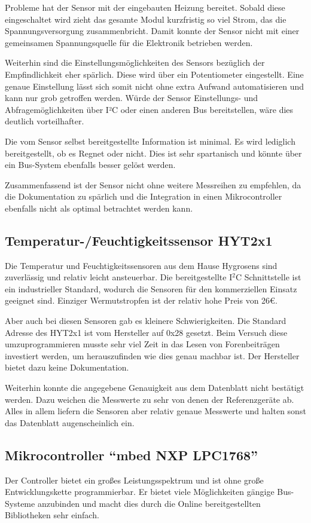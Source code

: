 			Probleme hat der Sensor mit der eingebauten Heizung bereitet. Sobald diese eingeschaltet wird zieht das gesamte Modul kurzfristig so viel Strom, das die Spannungsversorgung zusammenbricht. Damit konnte der Sensor nicht mit einer gemeinsamen Spannungsquelle für die Elektronik betrieben werden.
			
			Weiterhin sind die Einstellungsmöglichkeiten des Sensors bezüglich der Empfindlichkeit eher spärlich. Diese wird über ein Potentiometer eingestellt. Eine genaue Einstellung lässt sich somit nicht ohne extra Aufwand automatisieren und kann nur grob getroffen werden. Würde der Sensor Einstellungs- und Abfragemöglichkeiten über I²C oder einen anderen Bus bereitstellen, wäre dies deutlich vorteilhafter.
			
			Die vom Sensor selbst bereitgestellte Information ist minimal. Es wird lediglich bereitgestellt, ob es Regnet oder nicht. Dies ist sehr spartanisch und könnte über ein Bus-System ebenfalls besser gelöst werden.
			
			Zusammenfassend ist der Sensor nicht ohne weitere Messreihen zu empfehlen, da die Dokumentation zu spärlich und die Integration in einen Mikrocontroller ebenfalls nicht als optimal betrachtet werden kann.
		\subsection{Temperatur-/Feuchtigkeitssensor HYT2x1}
			Die Temperatur und Feuchtigkeitssensoren aus dem Hause Hygrosens sind zuverlässig und relativ leicht ansteuerbar. Die bereitgestellte I$^{2}$C Schnittstelle ist ein industrieller Standard, wodurch die Sensoren für den kommerziellen Einsatz geeignet sind. Einziger Wermutstropfen ist der relativ hohe Preis von 26\euro{}.
			
			Aber auch bei diesen Sensoren gab es kleinere Schwierigkeiten. Die Standard Adresse des HYT2x1 ist vom Hersteller auf 0x28 gesetzt. Beim Versuch diese umzuprogrammieren musste sehr viel Zeit in das Lesen von Forenbeiträgen investiert werden, um herauszufinden wie dies genau machbar ist. Der Hersteller bietet dazu keine Dokumentation.
			
			Weiterhin konnte die angegebene Genauigkeit aus dem Datenblatt nicht bestätigt werden. Dazu weichen die Messwerte zu sehr von denen der Referenzgeräte ab. Alles in allem liefern die Sensoren aber relativ genaue Messwerte und halten sonst das Datenblatt augenscheinlich ein.
		\subsection{Mikrocontroller \enquote{mbed NXP LPC1768}}
			Der Controller bietet ein großes Leistungsspektrum und ist ohne große Entwicklungskette programmierbar. Er bietet viele Möglichkeiten gängige Bus-Systeme anzubinden und macht dies durch die Online bereitgestellten Bibliotheken sehr einfach.
			
